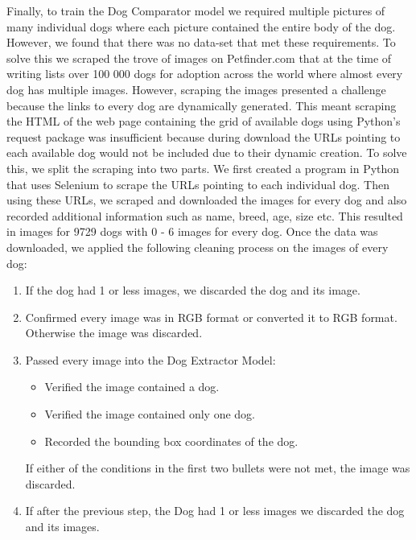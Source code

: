 \documentclass{article}
\begin{document}
Finally, to train the Dog Comparator model we required multiple pictures of many individual dogs where each picture contained the entire body of the dog.  However, we found that there was no data-set that met these requirements.  To solve this we scraped the trove of images on Petfinder.com that at the time of writing lists over 100 000 dogs for adoption across the world where almost every dog has multiple images.  However, scraping the images presented a challenge because the links to every dog are dynamically generated.  This meant scraping the HTML of the web page containing the grid of available dogs using Python's request package was insufficient because during download the URLs pointing to each available dog would not be included due to their dynamic creation.  To solve this, we split the scraping into two parts.  We first created a program in Python that uses Selenium to scrape the URLs pointing to each individual dog.  Then using these URLs, we scraped and downloaded the images for every dog and also recorded additional information such as name, breed, age, size etc.  This resulted in images for 9729 dogs with 0 - 6 images for every dog.  Once the data was downloaded, we applied the following cleaning process on the images of every dog:
\begin{enumerate}
  
  \item If the dog had 1 or less images, we discarded the dog and its image.
  
  \item Confirmed every image was in RGB format or converted it to RGB format.  Otherwise the image was discarded.
  
  \item Passed every image into the Dog Extractor Model:
    \begin{itemize}
      \item Verified the image contained a dog.
      \item Verified the image contained only one dog.
      \item Recorded the bounding box coordinates of the dog.
    \end{itemize}
    If either of the conditions in the first two bullets were not met, the image was discarded.
    
  \item If after the previous step, the Dog had 1 or less images we discarded the dog and its images.
  
\end{enumerate}
\end{document}
